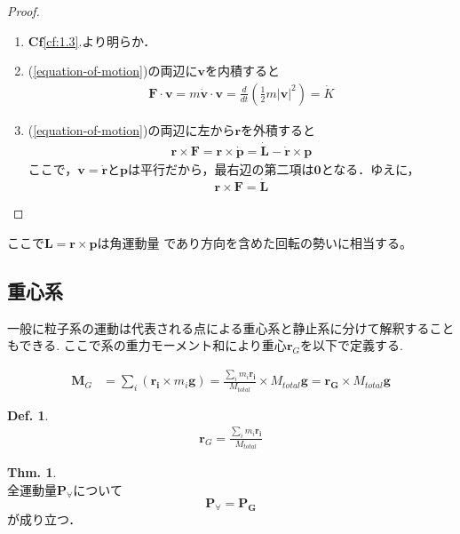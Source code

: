 \documentclass[dvipdfmx,uplatex]{jsarticle}
\theoremstyle{definition}
\newtheorem{theo}[law]{Thm.}
\newtheorem{defi}[law]{Def.}
\begin{document}
\begin{proof}\mbox{}
  \begin{enumerate}
    \item[(\ref{eq:1.2})] $\mathbf{Cf}$\ref{cf:1.3}.より明らか．
    \item[(\ref{eq:1.3})] (\ref{equation-of-motion})の両辺に$\bm{v}$を内積すると
    \begin{align*}
      \bm{F} \cdot \bm{v} = m \dot{\bm{v}} \cdot \bm{v} = \frac{d}{dt} \left( \frac{1}{2} m | \bm{v} |^2 \right) = \dot{K}
    \end{align*}
    \item[(\ref{eq:1.4})] (\ref{equation-of-motion})の両辺に左から$\bm{r}$を外積すると
    \begin{align*}
      \bm{r} \times \bm{F} = \bm{r} \times \dot{\bm{p}} = \dot{\bm{L}} - \dot{\bm{r}} \times \bm{p}
    \end{align*}
    ここで，$\bm{v} = \dot{\bm{r}}$と$\bm{p}$は平行だから，最右辺の第二項は$\bm{0}$となる．ゆえに，
    \begin{equation*}
      \bm{r} \times \bm{F} = \dot{\bm{L}}
    \end{equation*}
  \end{enumerate}
\end{proof}

ここで$\bm{L} = \bm{r} \times \bm{p}$は角運動量
であり方向を含めた回転の勢いに相当する。


\subsection{重心系}
一般に粒子系の運動は代表される点による重心系と静止系に分けて解釈することもできる.
ここで系の重力モーメント和により重心$\bm{r}_G$を以下で定義する.

\begin{align*}
  \bm{M}_G &= \sum_i (\bm{r_i} \times m_i \bm{g}) = \frac{\sum\limits_i m_i \bm{r_i}}{M_{total}} \times M_{total} \bm{g} = \bm{r_G} \times M_{total} \bm{g}
\end{align*}

\begin{defi}
  \begin{align*}
    \bm{r}_G =  \frac{\sum\limits_i m_i \bm{r_i}}{M_{total}}
  \end{align*}
\end{defi}

\begin{theo}\mbox{}\\
  全運動量$ \bm{P}_{\forall} $について
  \begin{equation*}
    \bm{P}_{\forall} = \bm{P_G}
  \end{equation*}
  が成り立つ．
\end{theo}
\end{document}
